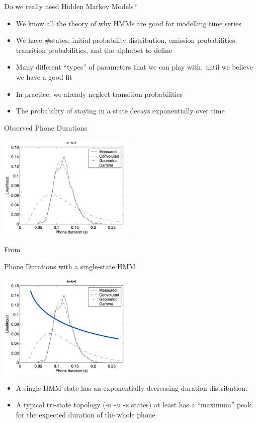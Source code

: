 \begin{frame}{Do we really need Hidden Markov Models?}
  \begin{itemize}
  \item We know all the theory of why HMMs are good for modelling time series
  \item We have \#states, initial probability distribution, emission probabilities,
    transition probabilities, and the alphabet to define
  \item Many different ``types'' of parameters that we can play with, until we believe we have a good fit
  \item In practice, we already neglect transition probabilities
  \item The probability of staying in a state decays exponentially over time
  \end{itemize}
\end{frame}

\begin{frame}{Observed Phone Durations}
  \begin{center}
    \includegraphics[height=50mm]{figures/durations}
  \end{center}
  \tiny From \cite{Pylkkonen04durationmodeling}
\end{frame}

\begin{frame}{Phone Durations with a single-state HMM}
  \begin{center}
    \includegraphics[height=50mm]{figures/durations3}
  \end{center}
  \begin{itemize}
  \item A single HMM state has an exponentially decreasing duration distribution.
  \item A typical tri-state topology (\textsc{-b -m -e} states) at least has a ``maximum'' peak for
    the expected duration of the whole phone
  \end{itemize}
\end{frame}

